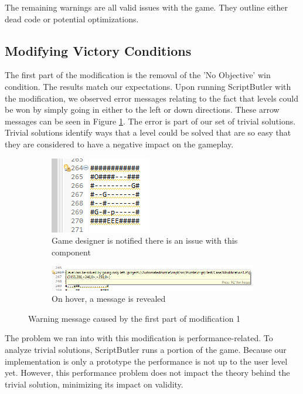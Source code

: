 The remaining warnings are all valid issues with the game. They outline either dead code or potential optimizations. 

\subsection{Modifying Victory Conditions}
The first part of the modification is the removal of the 'No Objective' win condition. The results match our expectations. Upon running ScriptButler with the modification, we observed error messages relating to the fact that levels could be won by simply going in either to the left or down directions. These arrow messages can be seen in Figure \ref{fig:modification_1_results}. The error is part of our set of trivial solutions. Trivial solutions identify ways that a level could be solved that are so easy that they are considered to have a negative impact on the gameplay.

\begin{figure}[!t]
    \begin{subfigure}{1\textwidth}
        \centering
        \includegraphics[scale=1.25]{images/case_results/Modification_1_Results_IDE.png}
        \caption{Game designer is notified there is an issue with this component}
    \end{subfigure}
    \begin{subfigure}{1\textwidth}
        \centering
        \includegraphics[scale=0.9]{images/case_results/Modification_1_Results.png}
        \caption{On hover, a message is revealed}
    \end{subfigure}
    \caption{Warning message caused by the first part of modification 1}
    \label{fig:modification_1_results}
\end{figure}

The problem we ran into with this modification is performance-related. To analyze trivial solutions, ScriptButler runs a portion of the game. Because our implementation is only a prototype the performance is not up to the user level yet. However, this performance problem does not impact the theory behind the trivial solution, minimizing its impact on validity.

